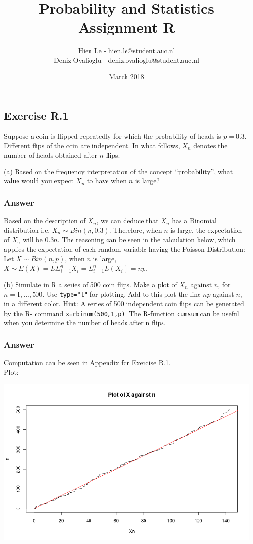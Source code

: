\documentclass[12pt]{article}
\title{Probability and Statistics \\ Assignment R}
\author{Hien Le - hien.le@student.auc.nl \\ Deniz Ovalioglu - deniz.ovalioglu@student.auc.nl}
\date{March 2018}
\begin{document}
\maketitle

\subsection*{Exercise R.1}
Suppose a coin is flipped repeatedly for which the probability of
heads is $p = 0.3$. Different flips of the coin are independent. In what follows, $X_{n}$ denotes the number of heads obtained after $n$ flips.

(a) Based on the frequency interpretation of the concept “probability”, what value would you expect $X_{n}$ to have when $n$ is large?
\subsubsection*{Answer}
Based on the description of $X_{n}$, we can deduce that $X_{n}$ has a Binomial distribution i.e. $X_{n} \sim Bin(n, 0.3)$. Therefore, when $n$ is large, the expectation of $X_{n}$ will be 0.3$n$. The reasoning can be seen in the calculation below, which applies the expectation of each random variable having the Poisson Distribution:\\
Let $X \sim Bin(n,p)$, when $n$ is large, $X \sim E(X) = E\Sigma^{n}_{i=1}X_{i} = \Sigma^{n}_{i=1}E(X_{i}) = np$.

(b) Simulate in R a series of 500 coin flips. Make a plot of $X_{n}$ against $n$, for $n = 1, . . . , 500$. Use \texttt{type="l"} for plotting. Add to this plot the line $np$ against $n$, in a different color.
Hint: A series of 500 independent coin flips can be generated by the R-
command \texttt{x=rbinom(500,1,p)}. The R-function \texttt{cumsum} can be useful when you determine the number of heads after n flips.
\subsubsection*{Answer}
Computation can be seen in Appendix for Exercise R.1.\\
Plot:

\includegraphics[width=\textwidth]{Ex1Plot1}
\end{document}
